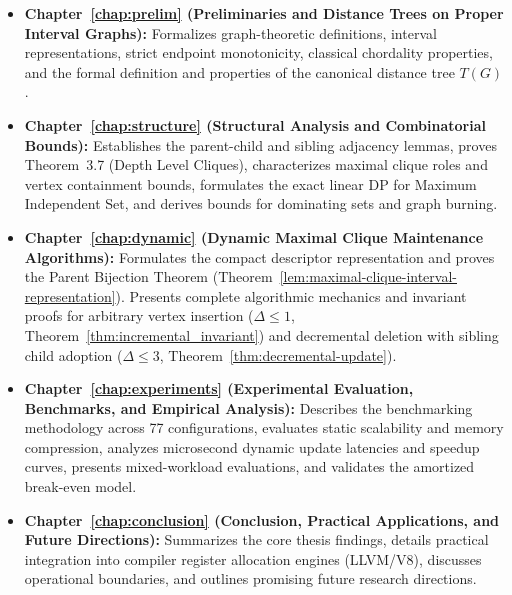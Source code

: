\begin{itemize}
    \item \textbf{Chapter~\ref{chap:prelim} (Preliminaries and Distance Trees on Proper Interval Graphs):} Formalizes graph-theoretic definitions, interval representations, strict endpoint monotonicity, classical chordality properties, and the formal definition and properties of the canonical distance tree $T(G)$.
    
    \item \textbf{Chapter~\ref{chap:structure} (Structural Analysis and Combinatorial Bounds):} Establishes the parent-child and sibling adjacency lemmas, proves Theorem~3.7 (Depth Level Cliques), characterizes maximal clique roles and vertex containment bounds, formulates the exact linear DP for Maximum Independent Set, and derives bounds for dominating sets and graph burning.
    
    \item \textbf{Chapter~\ref{chap:dynamic} (Dynamic Maximal Clique Maintenance Algorithms):} Formulates the compact descriptor representation and proves the Parent Bijection Theorem (Theorem~\ref{lem:maximal-clique-interval-representation}). Presents complete algorithmic mechanics and invariant proofs for arbitrary vertex insertion ($\Delta \le 1$, Theorem~\ref{thm:incremental_invariant}) and decremental deletion with sibling child adoption ($\Delta \le 3$, Theorem~\ref{thm:decremental-update}).
    
    \item \textbf{Chapter~\ref{chap:experiments} (Experimental Evaluation, Benchmarks, and Empirical Analysis):} Describes the benchmarking methodology across 77 configurations, evaluates static scalability and memory compression, analyzes microsecond dynamic update latencies and speedup curves, presents mixed-workload evaluations, and validates the amortized break-even model.
    
    \item \textbf{Chapter~\ref{chap:conclusion} (Conclusion, Practical Applications, and Future Directions):} Summarizes the core thesis findings, details practical integration into compiler register allocation engines (LLVM/V8), discusses operational boundaries, and outlines promising future research directions.
\end{itemize}
